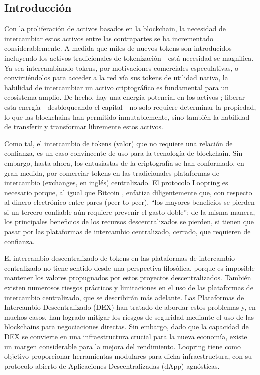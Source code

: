 \documentclass[UTF8,nofonts]{article}
\begin{document}
\begin{multicols}{2}
\section{Introducci\'on\label{sec:introduction}}
Con la proliferaci\'on de activos basados en la blockchain, la necesidad de intercambiar estos activos entre las contrapartes se ha incrementado considerablemente. A medida que miles de nuevos tokens son introducidos - incluyendo los activos tradicionales de tokenizaci\'on - est\'a necesidad se magnifica. Ya sea intercambiando tokens, por motivaciones comerciales especulativas, o convirti\'endolos para acceder a la red v\'ia sus tokens de utilidad nativa, la habilidad de intercambiar un activo criptogr\'afico es fundamental para un ecosistema amplio. De hecho, hay una energ\'ia potencial en los activos \cite{desotocapital}; liberar esta energ\'ia - desbloqueando el capital - no solo requiere determinar la propiedad, lo que las blockchains han permitido inmutablemente, sino tambi\'en la habilidad de transferir y transformar libremente estos activos.


Como tal, el intercambio de tokens (valor) que no requiere una relaci\'on de confianza, es un caso convincente de uso para la tecnolog\'ia de blockchain. Sin embargo, hasta ahora, los entusiastas de la criptograf\'ia se han conformado, en gran medida, por comerciar tokens en las tradicionales plataformas de intercambio (exchanges, en ingl\'es) centralizado. El protocolo Loopring es necesario porque, al igual que Bitcoin \cite{nakamoto2008bitcoin}, enfatiza diligentemente que, con respecto al dinero electr\'onico entre-pares (peer-to-peer), \enquote{los mayores beneficios se pierden si un tercero confiable a\'un requiere prevenir el gasto-doble}; de la misma manera, los principales beneficios de los recursos descentralizados se pierden, si tienen que pasar por las plataformas de intercambio centralizado, cerrado, que requieren de confianza.

El intercambio descentralizado de tokens en las plataformas de intercambio centralizado no tiene sentido desde una perspectiva filos\'ofica, porque es imposible mantener los valores propugnados por estos proyectos descentralizados. Tambi\'en existen numerosos riesgos pr\'acticos y limitaciones en el uso de las plataformas de intercambio centralizado, que se describir\'an m\'as adelante. Las Plataformas de Intercambio Descentralizado (DEX) \cite{schuh2015bitshares} \cite{bancor} \cite{kyber} han tratado de abordar estos problemas y, en muchos casos, han logrado mitigar los riesgos de seguridad mediante el uso de las blockchains para negociaciones directas. Sin embargo, dado que la capacidad de DEX se convierte en una infraestructura crucial para la nueva econom\'ia, existe un margen considerable para la mejora del rendimiento. Loopring tiene como objetivo proporcionar herramientas modulares para dicha infraestructura, con su protocolo abierto de Aplicaciones Descentralizadas (dApp) agn\'osticas.



\end{multicols}
\end{document}
